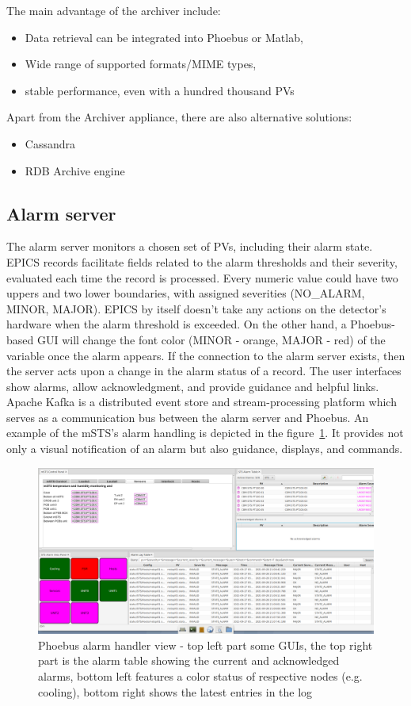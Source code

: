 The main advantage of the archiver include: 

\begin{itemize}
    \item Data retrieval can be integrated into Phoebus or Matlab,
    \item Wide range of supported formats/MIME types,
    \item stable performance, even with a hundred thousand \gls{PV}s
\end{itemize}
Apart from the Archiver appliance, there are also alternative solutions:

\begin{itemize}
    \item Cassandra \cite{cassandra_archive}
    \item RDB Archive engine \cite{rdb_archive}
\end{itemize}

\subsection{Alarm server}
The alarm server monitors a chosen set of \gls{PV}s, including their alarm state. EPICS records facilitate fields related to the alarm thresholds and their severity, evaluated each time the record is processed. Every numeric value could have two uppers and two lower boundaries, with assigned severities (NO\_ALARM, MINOR, MAJOR). EPICS by itself doesn't take any actions on the detector's hardware when the alarm threshold is exceeded. On the other hand, a Phoebus-based GUI will change the font color (MINOR - orange, MAJOR - red) of the variable once the alarm appears. If the connection to the alarm server exists, then the server acts upon a change in the alarm status of a record. The user interfaces show alarms, allow acknowledgment, and provide guidance and helpful links. Apache Kafka is a distributed event store and stream-processing platform which serves as a communication bus between the alarm server and Phoebus. An example of the mSTS's alarm handling is depicted in the figure~\ref{fig_alarm1}. It provides not only a visual notification of an alarm but also guidance, displays, and commands.
\begin{figure}[!h]
\centering
\includegraphics[width=1\columnwidth]{Chapter4/images/alarms.png}
\caption{Phoebus alarm handler view -  top left part some \gls{GUI}s, the top right part is the alarm table showing the current and acknowledged alarms, bottom left features a color status of respective nodes (e.g. cooling), bottom right shows the latest entries in the log}
\label{fig_alarm1}
\end{figure}
\newpage
